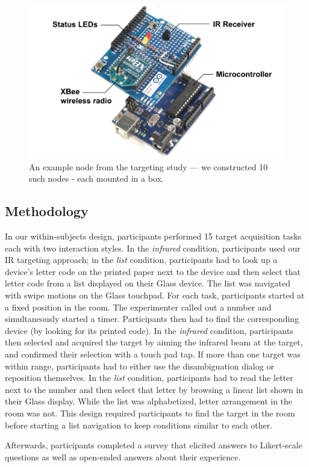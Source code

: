 \begin{figure}[b]
\centering
\includegraphics[width=0.8\columnwidth]{figures/study-node.pdf}
\caption{An example node from the targeting study --- we constructed 10 such nodes - each mounted in a box.}
\label{fig:targeting-study-layout}
\end{figure}

\subsection{Methodology}
In our within-subjects design, participants performed 15 target acquisition tasks each with two interaction styles. In the {\em infrared} condition, participants used our IR targeting approach; in the {\em list} condition, participants had to look up a device's letter code on the printed paper next to the device and then select that letter code from a list displayed on their Glass device. The list was navigated with swipe motions on the Glass touchpad. For each task, participants started at a fixed position in the room. The experimenter called out a number and simultaneously started a timer. Participants then had to find the corresponding device (by looking for its printed code). In the {\em infrared} condition, participants then selected and acquired the target by aiming the infrared beam at the target, and confirmed their selection with a touch pad tap. If more than one target was within range, participants had to either use the disambiguation dialog or reposition themselves. In the {\em list} condition, participants had to read the letter next to the number and then select that letter by browsing a linear list shown in their Glass display. While the list was alphabetized, letter arrangement in the room was not. This design required participants to find the target in the room before starting a list navigation to keep conditions similar to each other.

Afterwards, participants completed a survey that elicited answers to Likert-scale questions as well as open-ended answers about their experience.

